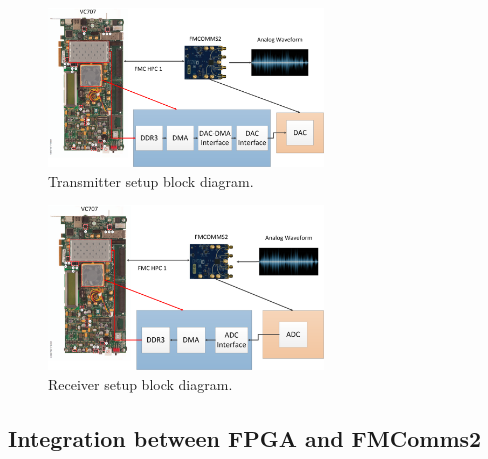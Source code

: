 \begin{figure}[htbp]
    \centering
    \includegraphics[width=0.65\textwidth]{./figures/tx_setup}
    \caption{ Transmitter setup block diagram.
    \label{fig:txsetup}}
\end{figure}

\begin{figure}[htbp]
    \centering
    \includegraphics[width=0.65\textwidth]{./figures/rx_setup}
    \caption{ Receiver setup block diagram.
    \label{fig:rxsetup}}
\end{figure}



\subsection{Integration between FPGA and FMComms2}



